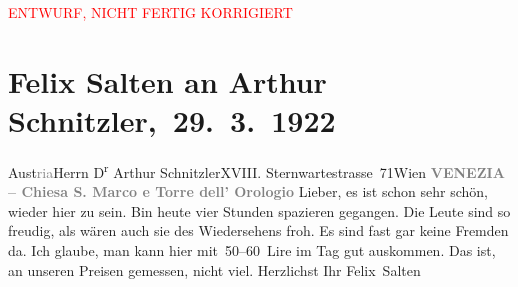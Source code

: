 
\begin{center}
            \textcolor{red}{ENTWURF, NICHT FERTIG KORRIGIERT}
                      \end{center}
            
         
         \renewcommand{\erwaehntePersonen}{Personen: Frieda Pollak, Felix Salten}
         \renewcommand{\erwaehnteOrte}{Orte: San Marco, Stazione di Venezia Santa Lucia, Sternwartestraße 71, Torre dell’Orologio, Venedig, Wien, Österreich}
         \renewcommand{\erwaehnteWerke}{}
               \section[ Felix Salten an Arthur Schnitzler, 29. 3. 1922]{ Felix Salten an Arthur Schnitzler, 29. 3. 1922}\nopagebreak{}\rehead{ }\begin{ledgroupsized}[t]{13cm}\normalsize\beginnumbering \toendnotes[C]{\smallbreak\pagebreak[2]} 
\toendnotes[C]{\smallbreak}\pstart{}{\pb}Aust\textcolor{gray}{ria}\pend{}\pstart{}Herrn D\textsuperscript{r} Arthur Schnitzler\pend{}\pstart{}XVIII. Sternwartestrasse 71\pend{}\pstart{}Wien\pend{}{\bigskip}\pstart
           \noindent{}\centering{}{\pb}\textcolor{gray}{\textbf{VENEZIA – Chiesa S. Marco e Torre dell’ Orologio}}\pend
           \pstart
           \noindent{}{\pb}Lieber, es ist schon sehr schön, wieder hier zu sein. Bin heute vier Stunden spazieren gegangen. Die Leute sind so freudig, als
               wären auch sie des Wiedersehens froh. Es sind fast gar keine Fremden da. Ich glaube,
               man kann hier mit 50–60 Lire im Tag gut auskommen. Das ist, an unseren Preisen
               gemessen, nicht viel.\pend
           \pstart Herzlichst Ihr \spacefill\mbox{Felix Salten}\pend{}
         
         \endnumbering{}\end{ledgroupsized}  \newcommand{\dateiname}{L03576}\newcommand{\titel}{Felix Salten an Arthur Schnitzler, 29. 3. 1922}\newcommand{\editorInnen}{Martin Anton Müller und Laura Untner}
      